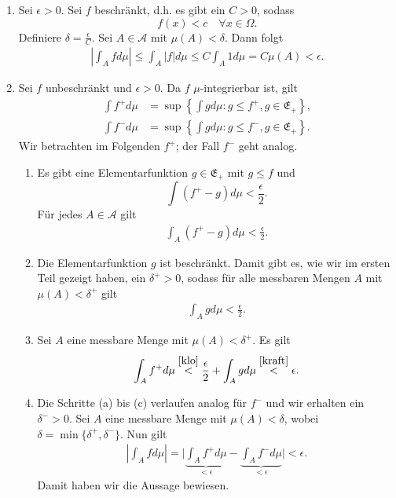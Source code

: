 \documentclass{article}
\begin{document}
\begin{enumerate}
    \item Sei $\epsilon > 0$. Sei $f$ beschränkt, d.h. es gibt ein $C > 0$, sodass
    $$
        f(x) < c \quad \forall x \in \Omega.
    $$ 
    Definiere $\delta = \frac{\epsilon}{C}$. Sei $A \in \mathcal A$ mit $\mu(A) < \delta$. Dann folgt
    \begin{align*}
        \left|\int_A f d\mu\right| \leq \int_A |f| d\mu \leq C \int_A 1 d\mu = C \mu(A) < \epsilon.
    \end{align*}

    \item Sei $f$ unbeschränkt und $\epsilon > 0$. Da $f$ $\mu$-integrierbar ist, gilt 
    \begin{align*}
        \int f^+ d\mu &= \sup\left\{ \int g d\mu : g \leq f^+, g \in \mathfrak E_+ \right\}, \\
        \int f^- d\mu &= \sup\left\{ \int g d\mu : g \leq f^-, g \in \mathfrak E_+ \right\}.
    \end{align*}
    Wir betrachten im Folgenden $f^+$; der Fall $f^-$ geht analog. 
    \begin{enumerate}
        \item Es gibt eine Elementarfunktion $g \in \mathfrak E_+$ mit $g \leq f$ und 
        $$
            \int (f^+ - g) d\mu < \frac{\epsilon}{2}.
        $$
        Für jedes $A \in \mathcal A$ gilt 
        \begin{align}\label{klo}
            \int_A (f^+ - g) d\mu < \frac{\epsilon}{2}.
        \end{align}

        \item Die Elementarfunktion $g$ ist beschränkt. Damit gibt es, wie wir im ersten Teil gezeigt haben, ein $\delta^+ > 0$, sodass für alle messbaren Mengen $A$ mit $\mu(A) < \delta^+$ gilt 
        \begin{align}\label{kraft}
            \int_A g d\mu < \frac{\epsilon}{2}.
        \end{align}

        \item Sei $A$ eine messbare Menge mit $\mu(A) < \delta^+$. Es gilt 
        \begin{align*}
            \int_A f^+ d\mu \overset{\eqref{klo}}{<} \frac{\epsilon}{2} + \int_A g d\mu \overset{\eqref{kraft}}{<} \epsilon.
        \end{align*}

        \item Die Schritte (a) bis (c) verlaufen analog für $f^-$ und wir erhalten ein $\delta^- > 0$. Sei $A$ eine messbare Menge mit $\mu(A) < \delta$, wobei $\delta = \min\{ \delta^+, \delta^- \}$. Nun gilt 
        \begin{align*}
            \left|\int_A f d\mu\right| = \Bigg|\underbrace{\int_A f^+ d\mu}_{< \epsilon} - \underbrace{\int_A f^- d\mu}_{<\epsilon}\Bigg| < \epsilon.
        \end{align*}
        Damit haben wir die Aussage bewiesen.
    \end{enumerate}
\end{enumerate}
\end{document}
